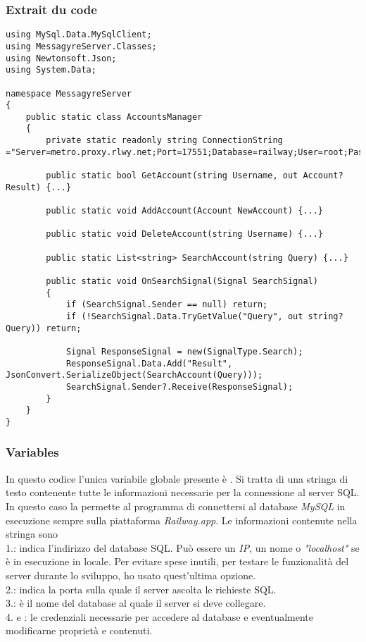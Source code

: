 \documentclass{article}
\begin{document}
\subsubsection{Extrait du code}
\begin{verbatim}
using MySql.Data.MySqlClient;
using MessagyreServer.Classes;
using Newtonsoft.Json;
using System.Data;

namespace MessagyreServer
{
	public static class AccountsManager
	{
		private static readonly string ConnectionString ="Server=metro.proxy.rlwy.net;Port=17551;Database=railway;User=root;Password=uGZBAjgfYSXFTcfJDWySgEVBxjScuDwB;\r\n";
		
		public static bool GetAccount(string Username, out Account? Result) {...}
		
		public static void AddAccount(Account NewAccount) {...}
		
		public static void DeleteAccount(string Username) {...}

		public static List<string> SearchAccount(string Query) {...}
		
		public static void OnSearchSignal(Signal SearchSignal)
		{
			if (SearchSignal.Sender == null) return;
			if (!SearchSignal.Data.TryGetValue("Query", out string? Query)) return;
			
			Signal ResponseSignal = new(SignalType.Search);
			ResponseSignal.Data.Add("Result", JsonConvert.SerializeObject(SearchAccount(Query)));
			SearchSignal.Sender?.Receive(ResponseSignal);
		}
	}
}
\end{verbatim}

\subsubsection{Variables}
In questo codice l'unica variabile globale presente è . Si tratta di una stringa di testo contenente tutte le informazioni necessarie per la connessione al server SQL. In questo caso la  permette al programma di connettersi al database \textit{MySQL} in esecuzione sempre sulla piattaforma \textit{Railway.app}. Le informazioni contenute nella stringa sono\\ 
1.: indica l'indirizzo del database SQL. Può essere un \textit{IP}, un nome o \textit{"localhost"} se è in esecuzione in locale. Per evitare spese inutili, per testare le funzionalità del server durante lo sviluppo, ho usato quest'ultima opzione.\\
2.: indica la porta sulla quale il server ascolta le richieste SQL.\\ 
3.: è il nome del database al quale il server si deve collegare.\\
4. e : le credenziali necessarie per accedere al database e eventualmente modificarne proprietà e contenuti.
\end{document}

